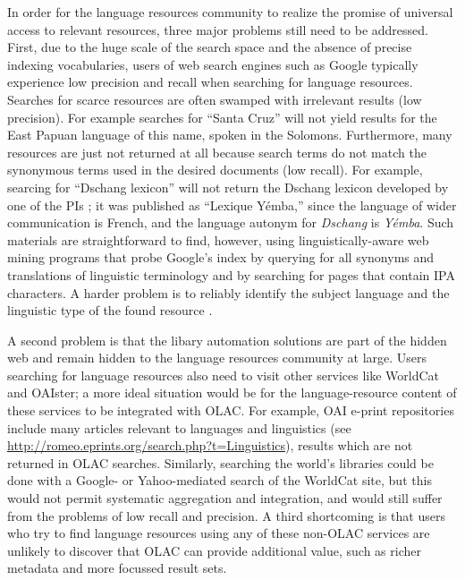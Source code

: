 In order for the language resources community to realize the promise of universal access to relevant resources, three major
problems still need to be addressed.
First, due to the huge scale of the search space and the absence
of precise indexing vocabularies,
users of web search engines such as Google typically experience
low precision and recall when searching for language resources.
Searches for scarce resources are often swamped with irrelevant
results (low precision).  For example searches for ``Santa Cruz'' will
not yield results for the East Papuan language of this name, spoken in
the Solomons.
Furthermore, many resources are just not returned at all because
search terms do not match the synonymous terms used in the desired
documents (low recall).  For example, searcing for ``Dschang lexicon''
will not return the Dschang lexicon developed by one of the PIs
\citep{BirdTadadjeu97}; it was published as ``Lexique Y\'emba,'' since
the language of wider communication is French, and the language
autonym for \textit{Dschang} is \textit{Y\'emba}.
Such materials are straightforward to find, however, using
linguistically-aware web mining programs that probe
Google's index by querying for all synonyms and translations of
linguistic terminology and by searching for pages that contain IPA characters.
A harder problem is to reliably identify the subject language and the
linguistic type of the found resource \citep{HughesBaldwin06lrec}.

A second problem is that the libary automation solutions are part of
the hidden web and remain hidden to the language resources community
at large.
Users searching for language
resources also need to visit other services like WorldCat and OAIster;
a more ideal situation would be for the language-resource content
of these services to be integrated with OLAC.
For example, OAI e-print repositories include many articles
relevant to languages and linguistics (see
\url{http://romeo.eprints.org/search.php?t=Linguistics}),
results which are not returned in OLAC searches.
Similarly, searching the world's libraries could be done with a Google-
or Yahoo-mediated search of the WorldCat site, but this would not
permit systematic aggregation and integration, and would still suffer
from the problems of low recall and precision.
A third shortcoming is that users who try to find language resources
using any of these non-OLAC services are unlikely to discover that
OLAC can provide additional value, such as richer metadata and more
focussed result sets.

